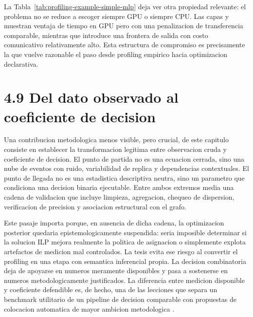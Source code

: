 \begin{table}[t]
\centering
\caption{Extracto empirico de coeficientes robustos de profiling para .}
\label{tab:profiling-example-simple-mlp}
\scriptsize
{}
\normalsize
\end{table}

La Tabla~\ref{tab:profiling-example-simple-mlp} deja ver otra propiedad relevante: el problema no se reduce a escoger siempre GPU o siempre CPU. Las capas  y  muestran ventaja de tiempo en GPU pero con una penalizacion de transferencia comparable, mientras que  introduce una frontera de salida con costo comunicativo relativamente alto. Esta estructura de compromiso es precisamente la que vuelve razonable el paso desde profiling empirico hacia optimizacion declarativa.

\section{4.9 Del dato observado al coeficiente de decision}
Una contribucion metodologica menos visible, pero crucial, de este capitulo consiste en establecer la transformacion legitima entre observacion cruda y coeficiente de decision. El punto de partida no es una ecuacion cerrada, sino una nube de eventos con ruido, variabilidad de replica y dependencias contextuales. El punto de llegada no es una estadistica descriptiva neutra, sino un parametro que condiciona una decision binaria ejecutable. Entre ambos extremos media una cadena de validacion que incluye limpieza, agregacion, chequeo de dispersion, verificacion de precision y asociacion estructural con el grafo.

Este pasaje importa porque, en ausencia de dicha cadena, la optimizacion posterior quedaria epistemologicamente suspendida: seria imposible determinar si la solucion ILP mejora realmente la politica de asignacion o simplemente explota artefactos de medicion mal controlados. La tesis evita ese riesgo al convertir el profiling en una etapa con semantica inferencial propia. La decision combinatoria deja de apoyarse en numeros meramente disponibles y pasa a sostenerse en numeros metodologicamente justificados. La diferencia entre medicion disponible y coeficiente defendible es, de hecho, una de las lecciones que separa un benchmark utilitario de un pipeline de decision comparable con propuestas de colocacion automatica de mayor ambicion metodologica \cite{mirhoseini2017device,jia2019beyond}.

